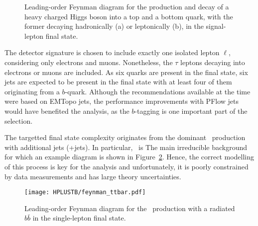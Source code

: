 \begin{figure}[htbp]
    \RawFloats
    \begin{center}
     \quad
    \caption{
        Leading-order Feynman diagram for the production and decay of a heavy charged Higgs boson into a top and a bottom quark, with the former decaying hadronically (a) or leptonically (b), in the signal-lepton final state.
    }
    \label{Hplustb:feynman2}
    \end{center}
\end{figure}

The detector signature is chosen to include exactly one isolated lepton $\ell$, considering only electrons and muons. Nonetheless, the $\tau$ leptons decaying into electrons or muons are included. As six quarks are present in the final state, six jets are expected to be present in the final state with at least four of them originating from a $b$-quark. Although the recommendations available at the time were based on EMTopo jets, the performance improvements with PFlow jets would have benefited the analysis, as the $b$-tagging is one important part of the selection.

The targetted final state complexity originates from the dominant \ttbar\ production with additional jets (\ttbar+jets). In particular, \ttb\ is The main irreducible background for which an example diagram is shown in Figure~\ref{Hplustb:feynman3}. Hence, the correct modelling of this process is key for the analysis and unfortunately, it is poorly constrained by data measurements and has large theory uncertainties. 


\begin{figure}[htbp]
    \RawFloats
    \begin{center}
    \texttt{[image: HPLUSTB/feynman\_ttbar.pdf]}
    \caption{
        Leading-order Feynman diagram for the \ttbar\ production with a radiated $b\bar{b}$ in the single-lepton final state.
    }
    \label{Hplustb:feynman3}
    \end{center}
\end{figure}

